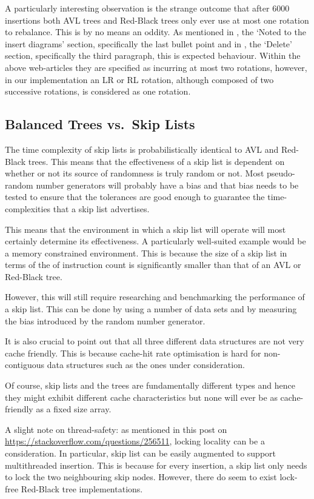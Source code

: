\documentclass[article]{uom-coursework}
\begin{document}
A particularly interesting observation is the strange outcome
that after 6000 insertions both AVL trees and Red-Black trees
only ever use at most one rotation to rebalance. This is by no
means an oddity. As mentioned in \textcite{wikirbtree}, the
`Noted to the insert diagrams' section, specifically the last
bullet point and in \textcite{wikiavltree}, the `Delete'
section, specifically the third paragraph, this is expected
behaviour. Within the above web-articles they are specified as
incurring at most two rotations, however, in our implementation
an LR or RL rotation, although composed of two successive
rotations, is considered as one rotation.

\subsection{Balanced Trees vs.\ Skip Lists}

The time complexity of skip lists is probabilistically identical
to AVL and Red-Black trees. This means that the effectiveness of
a skip list is dependent on whether or not its source of
randomness is truly random or not. Most pseudo-random number
generators will probably have a bias and that bias needs to be
tested to ensure that the tolerances are good enough to
guarantee the time-complexities that a skip list advertises.

This means that the environment in which a skip list will
operate will most certainly determine its effectiveness. A
particularly well-suited example would be a memory constrained
environment. This is because the size of a skip list in terms of
the of instruction count is significantly smaller than that of
an AVL or Red-Black tree.

However, this will still require researching and benchmarking
the performance of a skip list. This can be done by using a
number of data sets and by measuring the bias introduced by the
random number generator.

It is also crucial to point out that all three different data
structures are not very cache friendly. This is because
cache-hit rate optimisation is hard for non-contiguous data
structures such as the ones under consideration.

Of course, skip lists and the trees are fundamentally different
types and hence they might exhibit different cache
characteristics but none will ever be as cache-friendly as a
fixed size array.

A slight note on thread-safety: as mentioned in this post on
\url{https://stackoverflow.com/questions/256511}, locking
locality can be a consideration. In particular, skip list can be
easily augmented to support multithreaded insertion. This is
because for every insertion, a skip list only needs to lock the
two neighbouring skip nodes. However, there do seem to exist
lock-free Red-Black tree implementations.
\end{document}
